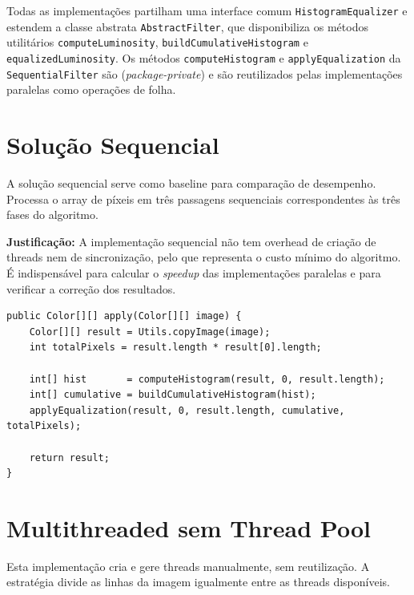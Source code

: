 \documentclass[a4paper,11pt,openright,BCOR=15mm]{scrbook}
\begin{document}
Todas as implementações partilham uma interface comum \texttt{HistogramEqualizer} e estendem a classe abstrata \texttt{AbstractFilter}, que disponibiliza os métodos utilitários \texttt{computeLuminosity}, \texttt{buildCumulativeHistogram} e \texttt{equalizedLuminosity}. Os métodos \texttt{computeHistogram} e \texttt{applyEqualization} da \texttt{SequentialFilter} são (\textit{package-private}) e são reutilizados pelas implementações paralelas como operações de folha.

\section{Solução Sequencial}

A solução sequencial serve como baseline para comparação de desempenho. Processa o array de píxeis em três passagens sequenciais correspondentes às três fases do algoritmo.

\textbf{Justificação:} A implementação sequencial não tem overhead de criação de threads nem de sincronização, pelo que representa o custo mínimo do algoritmo. É indispensável para calcular o \textit{speedup} das implementações paralelas e para verificar a correção dos resultados.

\begin{lstlisting}[caption={Núcleo da implementação sequencial}]
public Color[][] apply(Color[][] image) {
    Color[][] result = Utils.copyImage(image);
    int totalPixels = result.length * result[0].length;

    int[] hist       = computeHistogram(result, 0, result.length);
    int[] cumulative = buildCumulativeHistogram(hist);
    applyEqualization(result, 0, result.length, cumulative, totalPixels);

    return result;
}
\end{lstlisting}

\section{Multithreaded sem Thread Pool}

Esta implementação cria e gere threads manualmente, sem reutilização. A estratégia divide as linhas da imagem igualmente entre as threads disponíveis.
\end{document}
